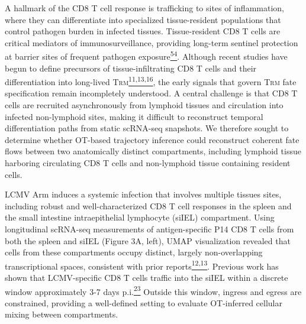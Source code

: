 A hallmark of the CD8 T cell response is trafficking to sites of
inflammation, where they can differentiate into specialized
tissue-resident populations that control pathogen burden in infected
tissues. Tissue-resident CD8 T cells are critical mediators of
immunosurveillance, providing long-term sentinel protection at barrier
sites of frequent pathogen
exposure\href{https://sciwheel.com/work/citation?ids=6419040\&pre=\&suf=\&sa=0\&dbf=0}{\textsuperscript{54}}.
Although recent studies have begun to define precursors of
tissue-infiltrating CD8 T cells and their differentiation into
long-lived
T\textsc{rm}\href{https://sciwheel.com/work/citation?ids=16689366,17904669,8917053\&pre=\&pre=\&pre=\&suf=\&suf=\&suf=\&sa=0,0,0\&dbf=0\&dbf=0\&dbf=0}{\textsuperscript{11,13,16}},
the early signals that govern T\textsc{rm} fate specification remain
incompletely understood. A central challenge is that CD8 T cells are
recruited asynchronously from lymphoid tissues and circulation into
infected non-lymphoid sites, making it difficult to reconstruct temporal
differentiation paths from static scRNA-seq snapshots. We therefore
sought to determine whether OT-based trajectory inference could
reconstruct coherent fate flows between two anatomically distinct
compartments, including lymphoid tissue harboring circulating CD8 T
cells and non-lymphoid tissue containing resident cells.

LCMV Arm induces a systemic infection that involves multiple tissues
sites, including robust and well-characterized CD8 T cell responses in
the spleen and the small intestine intraepithelial lymphocyte (siIEL)
compartment. Using longitudinal scRNA-seq measurements of
antigen-specific P14 CD8 T cells from both the spleen and siIEL (Figure
3A, left), UMAP visualization revealed that cells from these
compartments occupy distinct, largely non-overlapping transcriptional
spaces, consistent with prior
reports\href{https://sciwheel.com/work/citation?ids=8917053,8940021\&pre=\&pre=\&suf=\&suf=\&sa=0,0\&dbf=0\&dbf=0}{\textsuperscript{12,13}}.
Previous work has shown that LCMV-specific CD8 T cells traffic into the
siIEL within a discrete window approximately 3-7 days
p.i.\href{https://sciwheel.com/work/citation?ids=637212\&pre=\&suf=\&sa=0\&dbf=0}{\textsuperscript{23}}
Outside this window, ingress and egress are constrained, providing a
well-defined setting to evaluate OT-inferred cellular mixing between
compartments.

